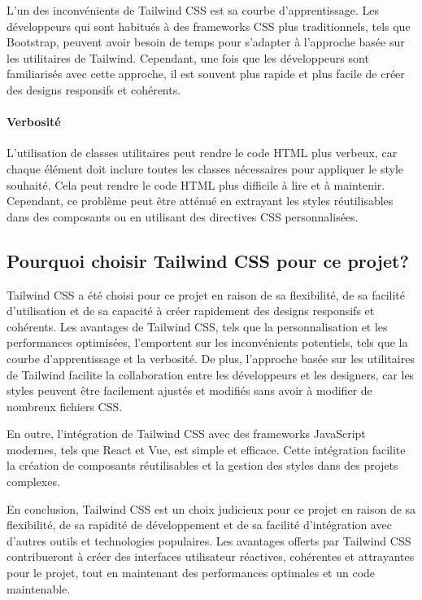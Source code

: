 L'un des inconvénients de Tailwind CSS est sa courbe d'apprentissage. Les développeurs qui sont habitués à des frameworks CSS plus traditionnels, tels que Bootstrap, peuvent avoir besoin de temps pour s'adapter à l'approche basée sur les utilitaires de Tailwind. Cependant, une fois que les développeurs sont familiarisés avec cette approche, il est souvent plus rapide et plus facile de créer des designs responsifs et cohérents.

\paragraph{Verbosité}

L'utilisation de classes utilitaires peut rendre le code HTML plus verbeux, car chaque élément doit inclure toutes les classes nécessaires pour appliquer le style souhaité. Cela peut rendre le code HTML plus difficile à lire et à maintenir. Cependant, ce problème peut être atténué en extrayant les styles réutilisables dans des composants ou en utilisant des directives CSS personnalisées.

\subsection{Pourquoi choisir Tailwind CSS pour ce projet?}

Tailwind CSS a été choisi pour ce projet en raison de sa flexibilité, de sa facilité d'utilisation et de sa capacité à créer rapidement des designs responsifs et cohérents. Les avantages de Tailwind CSS, tels que la personnalisation et les performances optimisées, l'emportent sur les inconvénients potentiels, tels que la courbe d'apprentissage et la verbosité. De plus, l'approche basée sur les utilitaires de Tailwind facilite la collaboration entre les développeurs et les designers, car les styles peuvent être facilement ajustés et modifiés sans avoir à modifier de nombreux fichiers CSS.

En outre, l'intégration de Tailwind CSS avec des frameworks JavaScript modernes, tels que React et Vue, est simple et efficace. Cette intégration facilite la création de composants réutilisables et la gestion des styles dans des projets complexes.

En conclusion, Tailwind CSS est un choix judicieux pour ce projet en raison de sa flexibilité, de sa rapidité de développement et de sa facilité d'intégration avec d'autres outils et technologies populaires. Les avantages offerts par Tailwind CSS contribueront à créer des interfaces utilisateur réactives, cohérentes et attrayantes pour le projet, tout en maintenant des performances optimales et un code maintenable.


